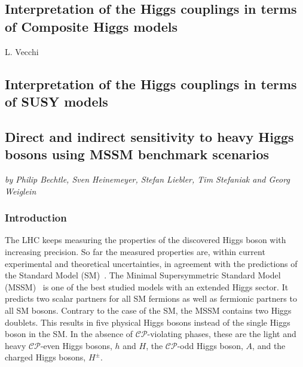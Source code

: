 \documentclass[../report.tex]{subfiles}
\providecommand{\main}{..}
\begin{document}
\subsection{Interpretation of the Higgs couplings in terms of Composite Higgs models}
\begin{center}
 {L. Vecchi}
\end{center}
\label{sec9:CHM}




\subsection{Interpretation of the Higgs couplings in terms of SUSY models}

\subsection{Direct and indirect sensitivity to heavy Higgs bosons using MSSM benchmark scenarios}
\begin{center}
\textit{by Philip Bechtle, Sven Heinemeyer, Stefan Liebler, Tim Stefaniak and Georg Weiglein}
\end{center}

\subsubsection*{Introduction}

The LHC keeps measuring the properties of the discovered Higgs boson with increasing precision. So far the measured properties are, within current experimental and theoretical uncertainties, in agreement with the predictions of the Standard Model (SM)~\cite{Khachatryan:2016vau}. The Minimal Supersymmetric Standard Model (MSSM)~\cite{Nilles:1983ge,Haber:1984rc,Gunion:1984yn} is one of the best studied models with an extended Higgs sector. It predicts two scalar partners for all SM fermions as well as fermionic partners to all SM bosons. Contrary to the case of the SM, the MSSM contains two Higgs doublets.
This results in five physical Higgs bosons instead of the single Higgs boson in the SM. In the absence of $\mathcal{CP}$-violating phases, these are the light and heavy $\mathcal{CP}$-even Higgs bosons,  
$h$ and $H$, the $\mathcal{CP}$-odd Higgs boson, $A$, and the charged Higgs bosons, $H^\pm$.
\end{document}
